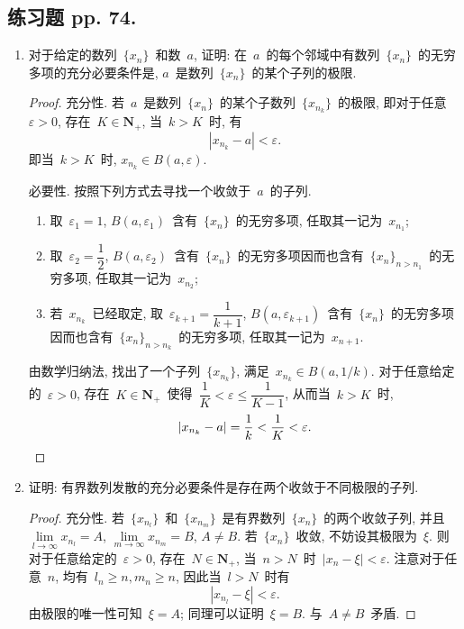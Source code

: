 \documentclass[UTF8,a4paper,11pt,twoside]{book}
\begin{document}
\subsection{练习题 pp. 74.}
\begin{enumerate}
	\item 对于给定的数列~$\{x_n\}$~和数~$a$, 证明: 在~$a$~的每个邻域中有数列~$\{x_n\}$~的无穷多项的充分必要条件是, $a$~是数列~$\{x_n\}$~的某个子列的极限.
	      \begin{proof}
		      充分性. 若~$a$~是数列~$\{x_n\}$~的某个子数列~$\{x_{n_k}\}$~的极限, 即对于任意~$\varepsilon>0$, 存在~$K\in\mathbf{N}_{+}$, 当~$k>K$~时, 有
		      \[
			      |x_{n_k}-a|<\varepsilon.
		      \]
		      即当~$k>K$~时, $x_{n_k}\in B(a,\varepsilon)$.

		      必要性. 按照下列方式去寻找一个收敛于~$a$~的子列.
		      \begin{enumerate}[(1)]
			      \item 取~$\varepsilon_1=1$, $B(a,\varepsilon_1)$~含有~$\{x_n\}$~的无穷多项, 任取其一记为~$x_{n_1}$;
			      \item 取~$\varepsilon_2=\dfrac{1}{2}$, $B(a,\varepsilon_2)$~含有~$\{x_n\}$~的无穷多项因而也含有~$\{x_n\}_{n>n_1}$~的无穷多项, 任取其一记为~$x_{n_2}$;
			      \item 若~$x_{n_k}$~已经取定, 取~$\varepsilon_{k+1}=\dfrac{1}{k+1}$, $B(a,\varepsilon_{k+1})$~含有~$\{x_n\}$~的无穷多项因而也含有~$\{x_n\}_{n>n_k}$~的无穷多项, 任取其一记为~$x_{n+1}$.
		      \end{enumerate}
		      由数学归纳法, 找出了一个子列~$\{x_{n_k}\}$, 满足~$x_{n_k}\in B(a,1/k)$. 对于任意给定的~$\varepsilon>0$, 存在~$K\in\mathbf{N}_{+}$~使得~$\dfrac{1}{K}<\varepsilon\leqslant\dfrac{1}{K-1}$, 从而当~$k>K$~时,
		      \[
			      |x_{n_k}-a|=\dfrac{1}{k}<\dfrac{1}{K}<\varepsilon. \qedhere
		      \]
	      \end{proof}

	\item 证明: 有界数列发散的充分必要条件是存在两个收敛于不同极限的子列.
	      \begin{proof}
		      充分性. 若~$\{x_{n_l}\}$~和~$\{x_{n_m}\}$~是有界数列~$\{x_n\}$~的两个收敛子列, 并且~$\lim\limits_{l\to\infty} x_{n_l}=A$, $\lim\limits_{m\to\infty} x_{n_m}=B$, $A\neq B$. 若~$\{x_n\}$~收敛, 不妨设其极限为~$\xi$. 则对于任意给定的~$\varepsilon>0$, 存在~$N\in\mathbf{N}_{+}$, 当~$n>N$~时~$|x_n-\xi|<\varepsilon$. 注意对于任意~$n$, 均有~$l_n\geqslant n, m_n\geqslant n$, 因此当~$l>N$~时有
		      \[
			      |x_{n_l}-\xi|<\varepsilon.
		      \]
		      由极限的唯一性可知~$\xi=A$; 同理可以证明~$\xi=B$. 与~$A\neq B$~矛盾.


\end{proof}
\end{enumerate}
\end{document}

